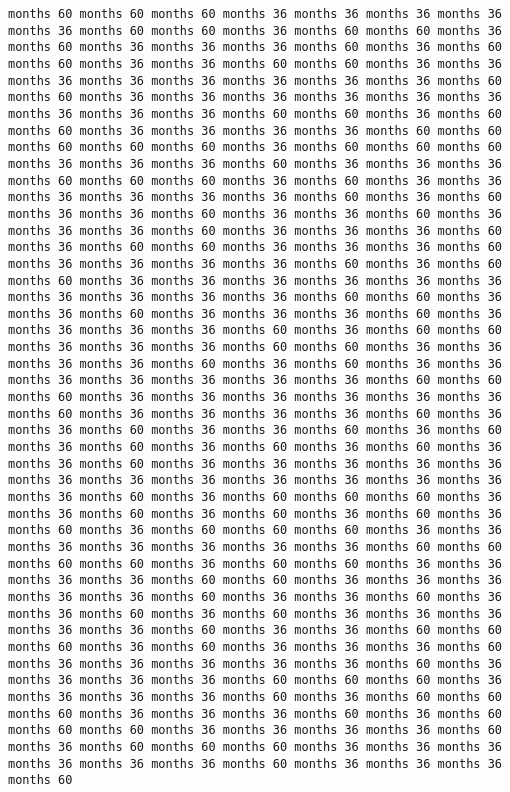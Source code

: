 \documentclass[11pt]{article}
\begin{document}
\begin{Verbatim}[commandchars=\\\{\}, frame=single, framerule=2mm, rulecolor=\color{outerrorbackground}]
months 60 months 60 months 60 months 36 months 36 months 36 months 36 months 36 months 60 months 60 months 36 months 60 months 60 months 36 months 60 months 36 months 36 months 36 months 60 months 36 months 60 months 60 months 36 months 36 months 60 months 60 months 36 months 36 months 36 months 36 months 36 months 36 months 36 months 36 months 60 months 60 months 36 months 36 months 36 months 36 months 36 months 36 months 36 months 36 months 36 months 60 months 60 months 36 months 60 months 60 months 36 months 36 months 36 months 36 months 60 months 60 months 60 months 60 months 60 months 36 months 60 months 60 months 60 months 36 months 36 months 36 months 60 months 36 months 36 months 36 months 60 months 60 months 60 months 36 months 60 months 36 months 36 months 36 months 36 months 36 months 36 months 60 months 36 months 60 months 36 months 36 months 60 months 36 months 36 months 60 months 36 months 36 months 36 months 60 months 36 months 36 months 36 months 60 months 36 months 60 months 60 months 36 months 36 months 36 months 60 months 36 months 36 months 36 months 36 months 60 months 36 months 60 months 60 months 36 months 36 months 36 months 36 months 36 months 36 months 36 months 36 months 36 months 36 months 60 months 60 months 36 months 36 months 60 months 36 months 36 months 36 months 60 months 36 months 36 months 36 months 36 months 60 months 36 months 60 months 60 months 36 months 36 months 36 months 60 months 60 months 36 months 36 months 36 months 36 months 60 months 36 months 60 months 36 months 36 months 36 months 36 months 36 months 36 months 36 months 60 months 60 months 60 months 36 months 36 months 36 months 36 months 36 months 36 months 60 months 36 months 36 months 36 months 36 months 60 months 36 months 36 months 60 months 36 months 36 months 60 months 36 months 60 months 36 months 60 months 36 months 60 months 36 months 60 months 36 months 36 months 60 months 36 months 36 months 36 months 36 months 36 months 36 months 36 months 36 months 36 months 36 months 36 months 36 months 36 months 60 months 36 months 60 months 60 months 60 months 36 months 36 months 60 months 36 months 60 months 36 months 60 months 36 months 60 months 36 months 60 months 60 months 60 months 36 months 36 months 36 months 36 months 36 months 36 months 36 months 60 months 60 months 60 months 60 months 36 months 60 months 60 months 36 months 36 months 36 months 36 months 60 months 60 months 36 months 36 months 36 months 36 months 36 months 60 months 36 months 36 months 60 months 36 months 36 months 60 months 36 months 60 months 36 months 36 months 36 months 36 months 36 months 60 months 36 months 36 months 60 months 60 months 60 months 36 months 60 months 36 months 36 months 36 months 60 months 36 months 36 months 36 months 36 months 36 months 60 months 36 months 36 months 36 months 36 months 60 months 60 months 60 months 36 months 36 months 36 months 36 months 60 months 36 months 60 months 60 months 60 months 36 months 36 months 36 months 60 months 36 months 60 months 60 months 60 months 36 months 36 months 36 months 36 months 60 months 36 months 60 months 60 months 60 months 36 months 36 months 36 months 36 months 36 months 36 months 60 months 36 months 36 months 36 months 60 
\end{Verbatim}
\end{document}
